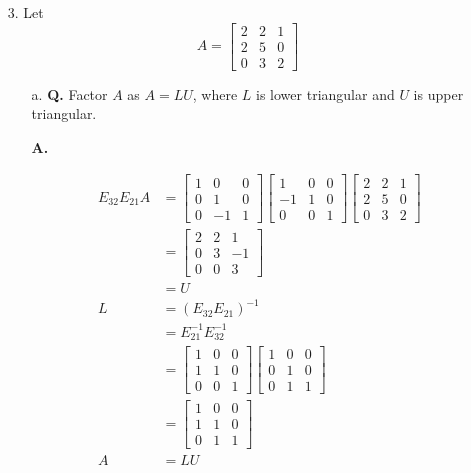 \documentclass[main.tex]{subfiles}
\begin{document}
\begin{enumerate}
\begin{enumerate}
\end{enumerate}

\item[3.] Let
$$
A=\left[\begin{array}{lll}
2 & 2 & 1 \\
2 & 5 & 0 \\
0 & 3 & 2
\end{array}\right]
$$
\begin{enumerate}
    \item [a.] \textbf{Q.} Factor $A$ as $A=L U$, where $L$ is lower triangular and $U$ is upper triangular. 
    
    \textbf{A.} 
    
    $$
    \begin{aligned}
    E_{32}E_{21}A &= \left[\begin{array}{lll}
    1 & 0 & 0 \\
    0 & 1 & 0 \\
    0 & -1 & 1
    \end{array}\right]\left[\begin{array}{lll}
    1 & 0 & 0 \\
    -1 & 1 & 0 \\
    0 & 0 & 1
    \end{array}\right]
    \left[\begin{array}{lll}
    2 & 2 & 1 \\
    2 & 5 & 0 \\
    0 & 3 & 2
    \end{array}\right] \\
    & = \left[\begin{array}{lll}
    2 & 2 & 1 \\
    0 & 3 & -1 \\
    0 & 0 & 3
    \end{array}\right]\\
    & = U\\
    L & = (E_{32}E_{21})^{-1}\\
    & = E_{21}^{-1}E_{32}^{-1}\\
    & = \left[\begin{array}{lll}
    1 & 0 & 0 \\
    1 & 1 & 0 \\
    0 & 0 & 1
    \end{array}\right]\left[\begin{array}{lll}
    1 & 0 & 0 \\
    0 & 1 & 0 \\
    0 & 1 & 1
    \end{array}\right]\\
    & = \left[\begin{array}{lll}
    1 & 0 & 0 \\
    1 & 1 & 0 \\
    0 & 1 & 1
    \end{array}\right]\\
    A & = LU
    \end{aligned}
    $$
    

\end{enumerate}
\end{enumerate}
\end{document}
